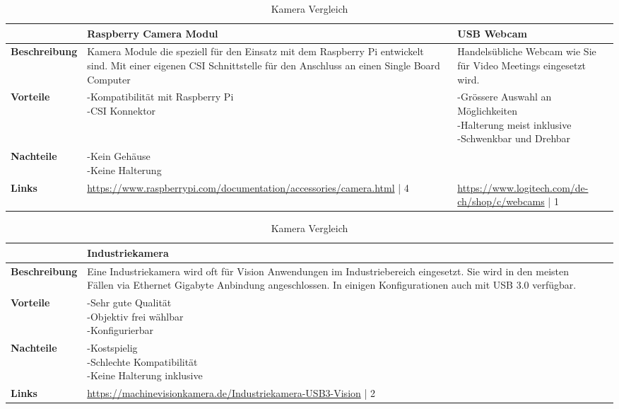 \begin{table}[H]
\centering
\small
\begin{tabularx}{\textwidth}{|l|X|X|}
\hline
\textbf{} & \textbf{Raspberry Camera Modul} & \textbf{USB Webcam}\\
  \hline
  \textbf{Beschreibung} & Kamera Module die speziell für den Einsatz mit dem Raspberry Pi entwickelt sind. Mit einer eigenen CSI Schnittstelle für den Anschluss an einen Single Board Computer & Handelsübliche Webcam wie Sie für Video Meetings eingesetzt wird. \\
  \hline
  \textbf{Vorteile}  & \makecell{-Kompatibilität mit Raspberry Pi \\ -CSI Konnektor} & \makecell{-Grössere Auswahl an Möglichkeiten \\ -Halterung meist inklusive \\ -Schwenkbar und Drehbar} \\
  \hline
  \textbf{Nachteile} & \makecell{-Kein Gehäuse \\ -Keine Halterung} & \makecell{} \\
  \hline
  \textbf{Links} & \url{https://www.raspberrypi.com/documentation/accessories/camera.html} | 4 & \url{https://www.logitech.com/de-ch/shop/c/webcams} | 1 \\
  \hline
\end{tabularx}
\begin{tabularx}{\textwidth}{|l|X|X|}
\hline
\textbf{} & \textbf{Industriekamera} & \textbf{} \\
  \hline
  \textbf{Beschreibung} & Eine Industriekamera wird oft für Vision Anwendungen im Industriebereich eingesetzt. Sie wird in den meisten Fällen via Ethernet Gigabyte Anbindung angeschlossen. In einigen Konfigurationen auch mit USB 3.0 verfügbar. & \\
  \hline
  \textbf{Vorteile}  & \makecell{-Sehr gute Qualität \\ -Objektiv frei wählbar \\ -Konfigurierbar} & \makecell{} \\
  \hline
  \textbf{Nachteile} & \makecell{-Kostspielig \\ -Schlechte Kompatibilität \\ -Keine Halterung inklusive} & \makecell{} \\
  \hline
  \textbf{Links} & \url{https://machinevisionkamera.de/Industriekamera-USB3-Vision} | 2 & \\
  \hline
\end{tabularx}
\caption{Kamera Vergleich}
\label{table:camera-compare}
\end{table}


